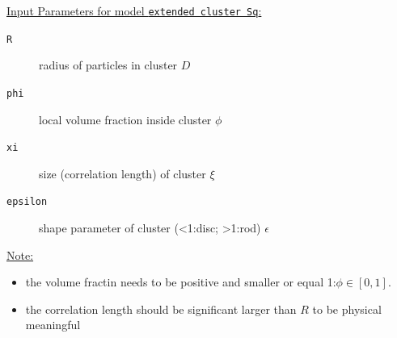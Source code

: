 \noindent \underline{Input Parameters for model \texttt{extended cluster Sq}:}
\begin{description}
\item[\texttt{R}] radius of particles in cluster $D$
\item[\texttt{phi}] local volume fraction inside cluster $\phi$
\item[\texttt{xi}] size (correlation length) of cluster $\xi$
\item[\texttt{epsilon}] shape parameter of cluster (<1:disc; >1:rod) $\epsilon$
\end{description}


\noindent\underline{Note:}
\begin{itemize}
\item the volume fractin needs to be positive and smaller or equal 1:$\phi\in [0,1]$.
\item the correlation length should be significant larger than $R$ to be physical meaningful
\end{itemize} 